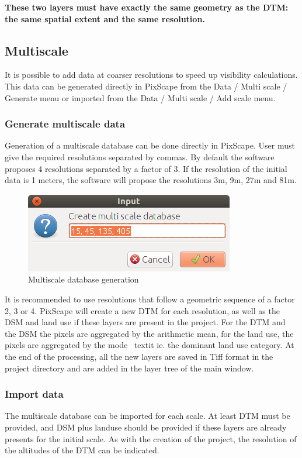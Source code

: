 \documentclass{report}
\begin{document}
\textbf{These two layers must have exactly the same geometry as the DTM: the same spatial extent and the same resolution.} 

\subsection{Multiscale}
It is possible to add data at coarser resolutions to speed up visibility calculations. This data can be generated directly in PixScape from the Data / Multi scale / Generate menu or imported from the Data / Multi scale / Add scale menu.

\subsubsection{Generate multiscale data}
Generation of a multiscale database can be done directly in PixScape. User must give the required resolutions separated by commas. By default the software proposes 4 resolutions separated by a factor of 3. If the resolution of the initial data is 1 meters, the software will propose the resolutions 3m, 9m, 27m and 81m.

\begin{figure}[H]
	\includegraphics[scale=0.5]{img/gen_ms-en.png} 
	\caption{Multiscale database generation}
\end{figure}

It is recommended to use resolutions that follow a geometric sequence of a factor 2, 3 or 4.
PixScape will create a new DTM for each resolution, as well as the DSM and land use if these layers are present in the project.
For the DTM and the DSM the pixels are aggregated by the arithmetic mean, for the land use, the pixels are aggregated by the mode \ textit {ie.} the dominant land use category.
At the end of the processing, all the new layers are saved in Tiff format in the project directory and are added in the layer tree of the main window.


\subsubsection{Import data}
The multiscale database can be imported for each scale. At least DTM must be provided, and DSM plus landuse should be provided if these layers are already presents for the initial scale. As with the creation of the project, the resolution of the altitudes of the DTM can be indicated.
\end{document}

